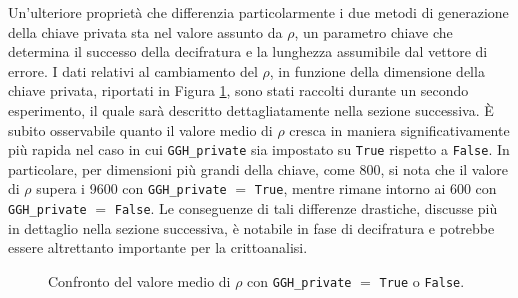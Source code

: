 Un'ulteriore proprietà che differenzia particolarmente i due metodi di generazione della 
chiave privata sta nel valore assunto da $\rho$, un parametro chiave che determina il 
successo della decifratura e la lunghezza assumibile dal vettore di errore. 
I dati relativi al cambiamento del $\rho$, in funzione della dimensione della chiave privata, riportati in 
Figura \ref{fig:rho_comparison}, sono stati raccolti durante un secondo esperimento, 
il quale sarà descritto dettagliatamente nella sezione successiva. 
È subito osservabile quanto il valore medio di $\rho$ cresca in maniera significativamente 
più rapida nel caso in cui \texttt{GGH\_private} sia impostato su \texttt{True} rispetto a 
\texttt{False}. In particolare, per dimensioni più grandi della chiave, come 800, si nota 
che il valore di $\rho$ supera i 9600 con \texttt{GGH\_private} $=$ \texttt{True}, mentre 
rimane intorno ai 600 con \texttt{GGH\_private} $=$ \texttt{False}. Le conseguenze di 
tali differenze drastiche, discusse più in dettaglio nella sezione successiva, è notabile 
in fase di decifratura e potrebbe essere altrettanto importante per la crittoanalisi. 

\begin{figure}[H]
    \centering
    \pgfplotsset{scaled y ticks=false}
    \caption{Confronto del valore medio di $\rho$ con \texttt{GGH\_private} $=$ \texttt{True} o \texttt{False}.}
    \label{fig:rho_comparison}
\end{figure}


